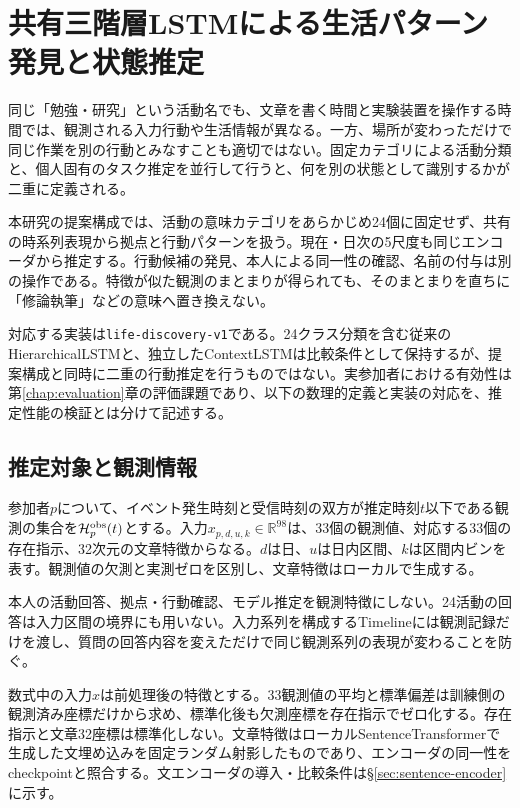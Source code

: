 \chapter{共有三階層LSTMによる生活パターン発見と状態推定}
\label{chap:model}

同じ「勉強・研究」という活動名でも、文章を書く時間と実験装置を操作する時間では、観測される入力行動や生活情報が異なる。一方、場所が変わっただけで同じ作業を別の行動とみなすことも適切ではない。固定カテゴリによる活動分類と、個人固有のタスク推定を並行して行うと、何を別の状態として識別するかが二重に定義される。

本研究の提案構成では、活動の意味カテゴリをあらかじめ24個に固定せず、共有の時系列表現から拠点と行動パターンを扱う。現在・日次の5尺度も同じエンコーダから推定する。行動候補の発見、本人による同一性の確認、名前の付与は別の操作である。特徴が似た観測のまとまりが得られても、そのまとまりを直ちに「修論執筆」などの意味へ置き換えない。

対応する実装は\texttt{life-discovery-v1}である。24クラス分類を含む従来のHierarchicalLSTMと、独立したContextLSTMは比較条件として保持するが、提案構成と同時に二重の行動推定を行うものではない。実参加者における有効性は第\ref{chap:evaluation}章の評価課題であり、以下の数理的定義と実装の対応を、推定性能の検証とは分けて記述する。

\section{推定対象と観測情報}
\label{sec:prediction-targets}

参加者\(p\)について、イベント発生時刻と受信時刻の双方が推定時刻\(t\)以下である観測の集合を\(\mathcal H_p^{\rm obs}(t)\)とする。入力\(x_{p,d,u,k}\in\mathbb R^{98}\)は、33個の観測値、対応する33個の存在指示、32次元の文章特徴からなる。\(d\)は日、\(u\)は日内区間、\(k\)は区間内ビンを表す。観測値の欠測と実測ゼロを区別し、文章特徴はローカルで生成する。

本人の活動回答、拠点・行動確認、モデル推定を観測特徴にしない。24活動の回答は入力区間の境界にも用いない。入力系列を構成するTimelineには観測記録だけを渡し、質問の回答内容を変えただけで同じ観測系列の表現が変わることを防ぐ。

数式中の入力\(x\)は前処理後の特徴とする。33観測値の平均と標準偏差は訓練側の観測済み座標だけから求め、標準化後も欠測座標を存在指示でゼロ化する。存在指示と文章32座標は標準化しない。文章特徴はローカルSentenceTransformerで生成した文埋め込みを固定ランダム射影したものであり、エンコーダの同一性をcheckpointと照合する。文エンコーダの導入・比較条件は§\ref{sec:sentence-encoder}に示す。

